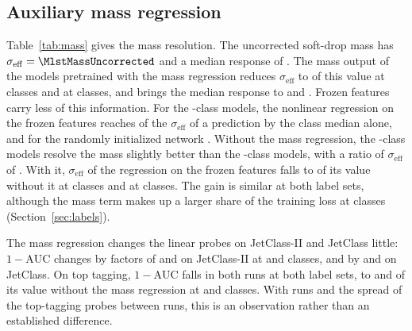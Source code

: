 \documentclass[11pt]{article}
\newcommand{\Kfull}{\VocabSizeLoneeighteight}
\newcommand{\Kres}{\VocabSizeLonesixtwo}
\newcommand{\Kcoarse}{\VocabSizeRonesixQone}
\newcommand{\oma}{\ensuremath{1-\mathrm{AUC}}}
\begin{document}
\subsection{Auxiliary mass regression}\label{sec:mass}


Table~\ref{tab:mass} gives the mass resolution. The uncorrected soft-drop mass has
$\sigma_{\mathrm{eff}} = \MlstMassUncorrected$ and a median response of
\MlstMassUncorrectedResponse. The mass output of the models pretrained with the mass regression
reduces $\sigma_{\mathrm{eff}}$ to \MlstMassHeadResMassOverUncorr{} of this value at \Kres{}
classes and \MlstMassHeadCoarseMassOverUncorr{} at \Kcoarse{} classes, and brings the median
response to \MlstMassHeadResMassResponse{} and \MlstMassHeadCoarseMassResponse. Frozen features
carry less of this information. For the \Kfull-class models, the nonlinear regression on the
frozen features reaches \MlstMassMlpFullOverTarget{} of the $\sigma_{\mathrm{eff}}$ of a
prediction by the class median alone, and for the randomly initialized network
\MlstMassMlpInitOverTarget. Without the mass regression, the \Kcoarse-class models resolve the
mass slightly better than the \Kfull-class models, with a ratio of $\sigma_{\mathrm{eff}}$ of
\MlstCmpMlpCoarseOverFull. With it, $\sigma_{\mathrm{eff}}$ of the regression on the frozen
features falls to \MlstCmpMlpResMassOverRes{} of its value without it at \Kres{} classes and
\MlstCmpMlpCoarseMassOverCoarse{} at \Kcoarse{} classes. The gain is similar at both label sets,
although the mass term makes up a larger share of the training loss at \Kcoarse{} classes
(Section~\ref{sec:labels}).

The mass regression changes the linear probes on JetClass-II and JetClass little: $\oma$ changes by
factors of \MlstCmpJcTwoResMassOverRes{} and \MlstCmpJcTwoCoarseMassOverCoarse{} on JetClass-II
at \Kres{} and \Kcoarse{} classes, and by \MlstCmpJcOneResMassOverRes{} and
\MlstCmpJcOneCoarseMassOverCoarse{} on JetClass. On top tagging, $\oma$ falls in both runs at
both label sets, to \MlstCmpTopResMassOverRes{} and \MlstCmpTopCoarseMassOverCoarse{} of its
value without the mass regression at \Kres{} and \Kcoarse{} classes. With \MlstMassNRunsWord{} runs
and the spread of the top-tagging probes between runs, this is an observation rather than an
established difference.
\end{document}
